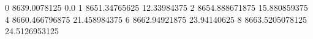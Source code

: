 0 8639.0078125 0.0
1 8651.34765625 12.33984375
2 8654.888671875 15.880859375
4 8660.466796875 21.458984375
6 8662.94921875 23.94140625
8 8663.5205078125 24.5126953125

